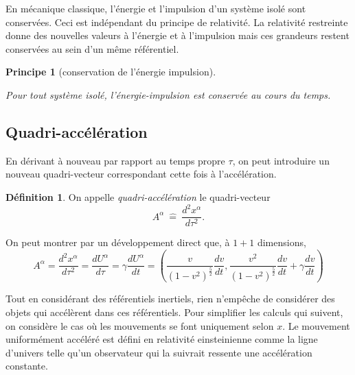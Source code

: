 \documentclass[a4paper,11pt]{report}
\theoremstyle{definition}
\theoremstyle{plain}
\newtheorem{prin}[thm]{Principe}
\theoremstyle{definition}
\newtheorem{defn}{Définition}[chapter]
\theoremstyle{remark}
\begin{document}
            En mécanique classique, l'énergie et l'impulsion d'un système isolé sont conservées. Ceci est indépendant du principe de relativité. La relativité restreinte donne des nouvelles valeurs à l'énergie et à l'impulsion mais ces grandeurs restent conservées au sein d'un même référentiel.\\
            
            \begin{prin}[conservation de l'énergie impulsion]
            \begin{leftbar}
                Pour tout système isolé, l'énergie-impulsion est conservée au cours du temps.
            \end{leftbar}
            \end{prin}
            
        \subsection{Quadri-accélération}
        
            En dérivant à nouveau par rapport au temps propre $\tau$, on peut introduire un nouveau quadri-vecteur correspondant cette fois à l'accélération.
            \begin{defn}
                On appelle \textit{quadri-accélération} le quadri-vecteur
                \begin{equation}
                    A^\alpha ~\hat{=}~ \frac{d^2x^\alpha}{d\tau^2}.
                \end{equation}
            \end{defn}
            On peut montrer par un développement direct que, à $1+1$ dimensions,
            \begin{equation}
                A^\alpha = \frac{d^2x^\alpha}{d\tau^2} = \frac{dU^\alpha}{d\tau} = \gamma\frac{dU^\alpha}{dt} = \left( \frac{v}{(1-v^2)^{\frac{5}{2}}}\frac{dv}{dt}, \frac{v^2}{(1-v^2)^{\frac{5}{2}}}\frac{dv}{dt} +\gamma \frac{dv}{dt}\right)
            \end{equation}
        
            Tout en considérant des référentiels inertiels, rien n'empêche de considérer des objets qui accélèrent dans ces référentiels. Pour simplifier les calculs qui suivent, on considère le cas où les mouvements se font uniquement selon $x$. Le mouvement uniformément accéléré est défini en relativité einsteinienne comme la ligne d'univers telle qu'un observateur qui la suivrait ressente une accélération constante.
            
\end{document}
